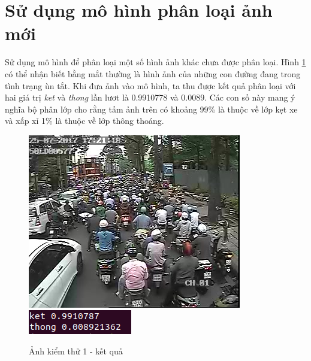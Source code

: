\section{Sử dụng mô hình phân loại ảnh mới}
	Sử dụng mô hình để phân loại một số hình ảnh khác chưa được phân loại. Hình \ref{fig:test1} có thể nhận biết bằng mắt thường là hình ảnh của những con đường đang trong tình trạng ùn tắt. Khi đưa ảnh vào mô hình, ta thu được kết quả phân loại với hai giá trị \textit{ket} và \textit{thong} lần lươt là 0.9910778 và 0.0089. Các con số này mang ý nghĩa bộ phân lớp cho rằng tấm ảnh trên có  khoảng 99\% là thuộc về lớp kẹt xe và xấp xỉ 1\% là thuộc về lớp thông thoáng.\par 
	\pagebreak	
	\begin{figure}[h!]
		\centering
		\includegraphics[scale=1]{charts/test-ket.jpg}
		\includegraphics[scale=0.5]{charts/test-ket-res.png}
		\caption{Ảnh kiểm thử 1 - kết quả}
		\label{fig:test1}
	\end{figure}
	
